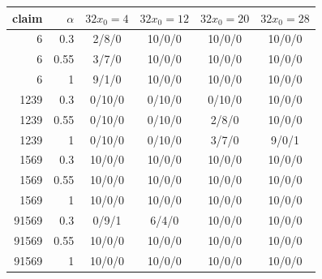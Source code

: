 \begin{tabular}{rrcccc}
\toprule
claim & $\alpha$ & $32x_0=4$ & $32x_0=12$ & $32x_0=20$ & $32x_0=28$ \\
\midrule
6 & 0.3 & 2/8/0 & 10/0/0 & 10/0/0 & 10/0/0 \\
6 & 0.55 & 3/7/0 & 10/0/0 & 10/0/0 & 10/0/0 \\
6 & 1 & 9/1/0 & 10/0/0 & 10/0/0 & 10/0/0 \\
1239 & 0.3 & 0/10/0 & 0/10/0 & 0/10/0 & 10/0/0 \\
1239 & 0.55 & 0/10/0 & 0/10/0 & 2/8/0 & 10/0/0 \\
1239 & 1 & 0/10/0 & 0/10/0 & 3/7/0 & 9/0/1 \\
1569 & 0.3 & 10/0/0 & 10/0/0 & 10/0/0 & 10/0/0 \\
1569 & 0.55 & 10/0/0 & 10/0/0 & 10/0/0 & 10/0/0 \\
1569 & 1 & 10/0/0 & 10/0/0 & 10/0/0 & 10/0/0 \\
91569 & 0.3 & 0/9/1 & 6/4/0 & 10/0/0 & 10/0/0 \\
91569 & 0.55 & 10/0/0 & 10/0/0 & 10/0/0 & 10/0/0 \\
91569 & 1 & 10/0/0 & 10/0/0 & 10/0/0 & 10/0/0 \\
\bottomrule
\end{tabular}
